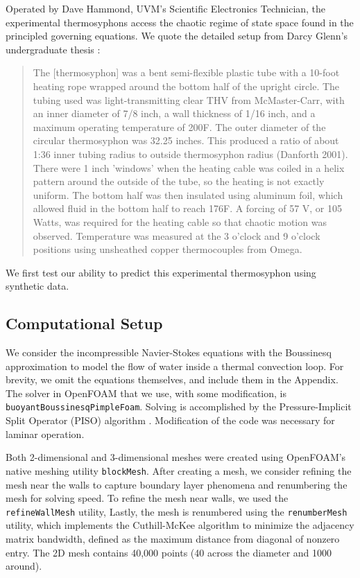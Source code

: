 Operated by Dave Hammond, UVM's Scientific Electronics Technician, the experimental thermosyphons access the chaotic regime of state space found in the principled governing equations.
We quote the detailed setup from Darcy Glenn's undergraduate thesis \cite{glenn2013}:
\begin{quote}
The [thermosyphon] was a bent semi-flexible plastic tube with a 10-foot heating rope wrapped around the bottom half of the upright circle.
The tubing used was light-transmitting clear THV from McMaster-Carr, with an inner diameter of 7/8 inch, a wall thickness of 1/16 inch, and a maximum operating temperature of 200F.
The outer diameter of the circular thermosyphon was 32.25 inches.
This produced a ratio of about 1:36 inner tubing radius to outside thermosyphon radius (Danforth 2001).
There were 1 inch 'windows' when the heating cable was coiled in a helix pattern around the outside of the tube, so the heating is not exactly uniform.
The bottom half was then insulated using aluminum foil, which allowed fluid in the bottom half to reach 176F.
A forcing of 57 V, or 105 Watts, was required for the heating cable so that chaotic motion was observed.
Temperature was measured at the 3 o'clock and 9 o'clock positions using unsheathed copper thermocouples from Omega.
\end{quote}
We first test our ability to predict this experimental thermosyphon using synthetic data.

\subsection{Computational Setup}
We consider the incompressible Navier-Stokes equations with the Boussinesq approximation to model the flow of water inside a thermal convection loop.
For brevity, we omit the equations themselves, and include them in the Appendix.
The solver in OpenFOAM that we use, with some modification, is \verb|buoyantBoussinesqPimpleFoam|.
Solving is accomplished by the Pressure-Implicit Split Operator (PISO) algorithm \cite{issa1986solution}.
Modification of the code was necessary for laminar operation.

Both 2-dimensional and 3-dimensional meshes were created using OpenFOAM's native meshing utility \verb|blockMesh|.
After creating a mesh, we consider refining the mesh near the walls to capture boundary layer phenomena and renumbering the mesh for solving speed.
To refine the mesh near walls, we used the \verb|refineWallMesh| utility, 
Lastly, the mesh is renumbered using the \verb|renumberMesh| utility, which implements the Cuthill-McKee algorithm to minimize the adjacency matrix bandwidth, defined as the maximum distance from diagonal of nonzero entry.
The 2D mesh contains 40,000 points (40 across the diameter and 1000 around).

